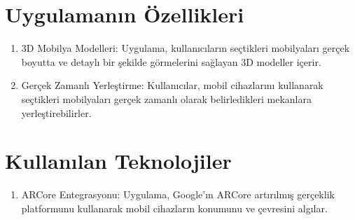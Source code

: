 \documentclass[12pt, a4paper]{article}
\begin{document}
	\section{Uygulamanın Özellikleri}
	\begin{enumerate}
		\item 3D Mobilya Modelleri: Uygulama, kullanıcıların seçtikleri mobilyaları gerçek boyutta ve detaylı bir şekilde görmelerini sağlayan 3D modeller içerir.
		\item  Gerçek Zamanlı Yerleştirme: Kullanıcılar, mobil cihazlarını kullanarak seçtikleri mobilyaları gerçek zamanlı olarak belirledikleri mekanlara yerleştirebilirler.\cite{drive}
		
	\end{enumerate}
	
	
	\section{Kullanılan Teknolojiler}
	\begin{enumerate}
		
		\item	ARCore Entegrasyonu: Uygulama, Google'ın ARCore artırılmış gerçeklik platformunu kullanarak mobil cihazların konumunu ve çevresini algılar.
	\end{enumerate}
	
\end{document}

